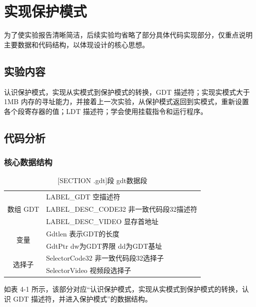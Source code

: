 \chapter{实现保护模式}\label{cha:latex-brief-intro}
为了使实验报告清晰简洁，后续实验均省略了部分具体代码实现部分，仅重点说明主要数据和代码结构，以体现设计的核心思想。

\section{实验内容}
认识保护模式，实现从实模式到保护模式的转换，GDT 描述符；实现实模式大于 1MB 内存的寻址能力，并接着上一次实验，从保护模式返回到实模式，重新设置各个段寄存器的值；LDT 描述符；学会使用挂载指令和运行程序。

\section{代码分析}

\subsection{核心数据结构}

\begin{table}[H]
\begin{center}
\caption{[SECTION .gdt]段 gdt数据段}
\begin{tabular}{|c|ll|}
\hline
\multirow{3}{*}{数组 GDT} & \multicolumn{2}{l|}{LABEL\_GDT 空描述符}                 \\ \cline{2-3} 
                        & \multicolumn{2}{l|}{LABEL\_DESC\_CODE32 非一致代码段32描述符} \\ \cline{2-3} 
                        & \multicolumn{2}{l|}{LABEL\_DESC\_VIDEO 显存首地址}        \\ \hline
\multirow{2}{*}{变量}     & \multicolumn{2}{l|}{Gdtlen 表示GDT的长度}                 \\ \cline{2-3} 
                        & \multicolumn{2}{l|}{GdtPtr dw为GDT界限 dd为GDT基址}        \\ \hline
\multirow{2}{*}{选择子}    & \multicolumn{2}{l|}{SelectorCode32 非一致代码段32选择子}      \\ \cline{2-3} 
                        & \multicolumn{2}{l|}{SelectorVideo 视频段选择子}            \\ \hline
\end{tabular}
\end{center}
\end{table}
如表 4-1 所示，该部分对应“认识保护模式，实现从实模式到保护模式的转换，认识 GDT 描述符，并进入保护模式”的数据结构。

